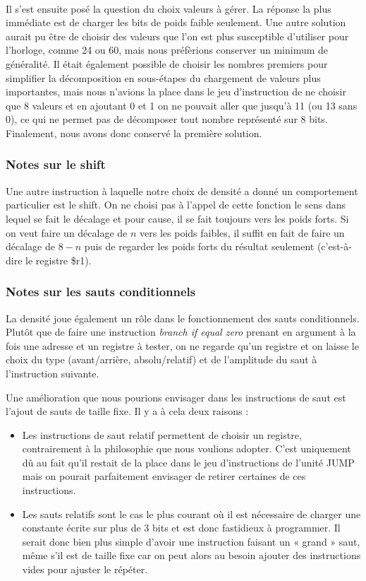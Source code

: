 \documentclass{article}
\begin{document}
\paragraph{}
Il s'est ensuite posé la question du choix valeurs à gérer. La réponse la plus immédiate
est de charger les bits de poids faible seulement. Une autre solution aurait
pu être de choisir des valeurs que l'on est plus susceptible d'utiliser pour l'horloge,
comme 24 ou 60, mais nous préfèrions conserver un minimum de généralité. Il était
également possible de choisir les nombres premiers pour simplifier la décomposition
en sous-étapes du chargement de valeurs plus importantes, mais nous n'avions la place
dans le jeu d'instruction de ne choisir que 8 valeurs et en ajoutant 0 et 1 on ne
pouvait aller que jusqu'à 11 (ou 13 sans 0), ce qui ne permet pas de décomposer
tout nombre représenté sur 8 bits. Finalement, nous avons donc conservé la première
solution.

\subsubsection{Notes sur le shift}
Une autre instruction à laquelle notre choix de densité a donné un comportement
particulier est le shift. On ne choisi pas à l'appel de cette fonction le sens dans
lequel se fait le décalage et pour cause, il se fait toujours vers les poids forts.
Si on veut faire un décalage de $n$ vers les poids faibles, il suffit en fait de
faire un décalage de $8 - n$ puis de regarder les poids forts du résultat seulement
(c'est-à-dire le registre \$r1).

\subsubsection{Notes sur les sauts conditionnels}
La densité joue également un rôle dans le fonctionnement des sauts conditionnels.
Plutôt que de faire une instruction \emph{branch if equal zero} prenant en argument
à la fois une adresse et un registre à tester, on ne regarde qu'un registre et on
laisse le choix du type (avant/arrière, absolu/relatif) et de l'amplitude du saut
à l'instruction suivante.

Une amélioration que nous pourions envisager dans les instructions de saut est
l'ajout de sauts de taille fixe. Il y a à cela deux raisons :
\begin{itemize}
  \item Les instructions de saut relatif permettent de choisir un registre, contrairement
        à la philosophie que nous voulions adopter. C'est uniquement dû au fait qu'il
        restait de la place dans le jeu d'instructions de l'unité JUMP mais on pourait
        parfaitement envisager de retirer certaines de ces instructions.
  \item Les sauts relatifs sont le cas le plus courant où il est nécessaire de charger
        une constante écrite sur plus de 3 bits et est donc fastidieux à programmer.
        Il serait donc bien plus simple d'avoir une instruction faisant un « grand »
        saut, même s'il est de taille fixe car on peut alors au besoin ajouter des
        instructions vides pour ajuster le répéter.
\end{itemize}
\end{document}
